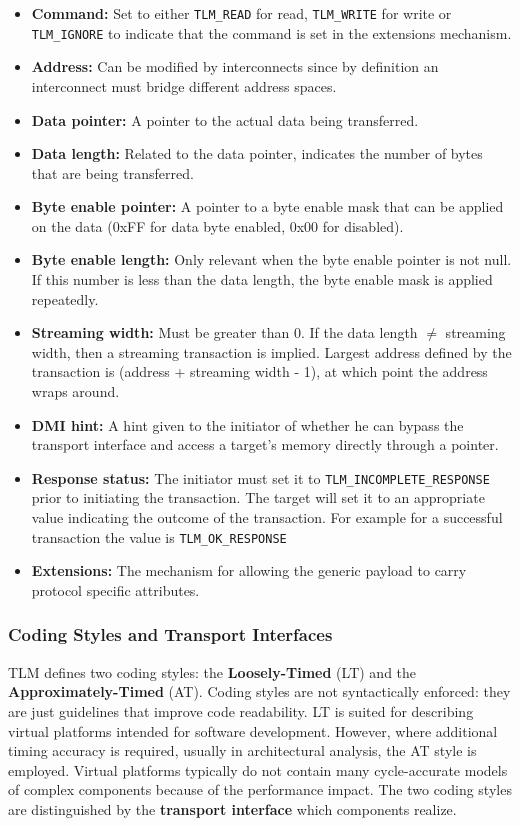 \documentclass[11pt]{article}
\begin{document}
\begin{itemize}
\item \textbf{Command:} Set to either \texttt{TLM\_READ} for read, \texttt{TLM\_WRITE} for write or \texttt{TLM\_IGNORE} to indicate that the command is set in the extensions mechanism.
\item \textbf{Address:} Can be modified by interconnects since by definition an interconnect must bridge different address spaces.
\item \textbf{Data pointer:} A pointer to the actual data being transferred.
\item \textbf{Data length:} Related to the data pointer, indicates the number of bytes that are being transferred.
\item \textbf{Byte enable pointer:} A pointer to a byte enable mask that can be applied on the data (0xFF for data byte enabled, 0x00 for disabled).
\item \textbf{Byte enable length:} Only relevant when the byte enable pointer is not null. If this number is less than the data length, the byte enable mask is applied repeatedly.
\item \textbf{Streaming width:} Must be greater than 0. If the data length \(\neq\) streaming width, then a streaming transaction is implied. Largest address defined by the transaction is (address + streaming width - 1), at which point the address wraps around.
\item \textbf{DMI hint:} A hint given to the initiator of whether he can bypass the transport interface and access a target's memory directly through a pointer.
\item \textbf{Response status:} The initiator must set it to \texttt{TLM\_INCOMPLETE\_RESPONSE} prior to initiating the transaction. The target will set it to an appropriate value indicating the outcome of the transaction. For example for a successful transaction the value is \texttt{TLM\_OK\_RESPONSE}
\item \textbf{Extensions:} The mechanism for allowing the generic payload to carry protocol specific attributes.
\end{itemize}

\subsubsection{Coding Styles and Transport Interfaces}
\label{sec:org2a4d607}
TLM defines two coding styles: the \textbf{Loosely-Timed} (LT) and the \textbf{Approximately-Timed} (AT).
Coding styles are not syntactically enforced: they are just guidelines that improve code readability.
LT is suited for describing virtual platforms intended for software development.
However, where additional timing accuracy is required, usually in architectural analysis, the AT style is employed.
Virtual platforms typically do not contain many cycle-accurate models of complex components because of the performance impact. 
The two coding styles are distinguished by the \textbf{transport interface} which components realize.
\end{document}
